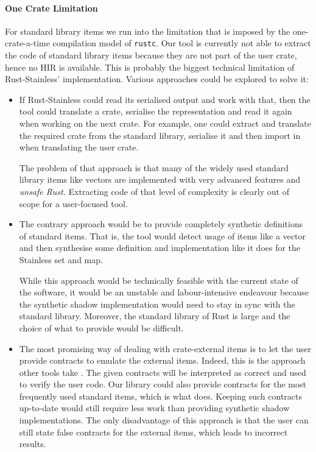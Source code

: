 \paragraph{One Crate Limitation}

For standard library items we run into the limitation that is imposed by the
one-crate-a-time compilation model of \passthrough{\lstinline!rustc!}. Our tool
is currently not able to extract the code of standard library items because they
are not part of the user crate, hence no HIR is available. This is probably the
biggest technical limitation of Rust-Stainless' implementation. Various
approaches could be explored to solve it:

\begin{itemize}
\item
  If Rust-Stainless could read its serialised output and work with that,
  then the tool could translate a crate, serialise the representation
  and read it again when working on the next crate. For example, one
  could extract and translate the required crate from the standard
  library, serialise it and then import in when translating the user
  crate.

  The problem of that approach is that many of the widely used standard
  library items like vectors are implemented with very advanced features
  and \emph{unsafe Rust.} Extracting code of that level of complexity is
  clearly out of scope for a user-focused tool.
\item
  The contrary approach would be to provide completely synthetic
  definitions of standard items. That is, the tool would detect usage of
  items like a vector and then synthesise some definition and
  implementation like it does for the Stainless set and map.

  While this approach would be technically feasible with the current
  state of the software, it would be an unstable and labour-intensive
  endeavour because the synthetic shadow implementation would need to
  stay in sync with the standard library. Moreover, the standard library
  of Rust is large and the choice of what to provide would be difficult.
\item
  The most promising way of dealing with crate-external items is to let
  the user provide contracts to emulate the external items. Indeed, this
  is the approach other tools take \cite{prusti, mirai}. The given
  contracts will be interpreted as correct and used to verify the user
  code. Our library could also provide contracts for the most frequently
  used standard items, which is what \cite{mirai} does. Keeping such
  contracts up-to-date would still require less work than providing
  synthetic shadow implementations. The only disadvantage of this
  approach is that the user can still state false contracts for the
  external items, which leads to incorrect results.
\end{itemize}

